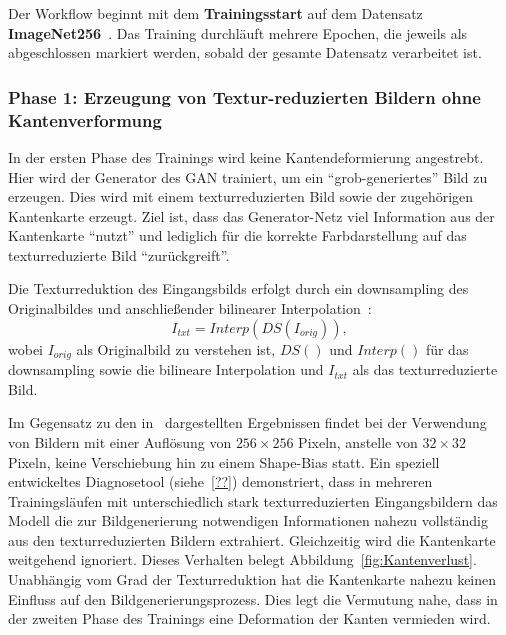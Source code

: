 Der Workflow beginnt mit dem \textbf{Trainingsstart} auf dem Datensatz \textbf{ImageNet256}~\cite{Uriot2023imageNet}. Das Training durchläuft mehrere Epochen, die jeweils als abgeschlossen markiert werden, sobald der gesamte Datensatz verarbeitet ist.

\newpage



\subsubsection{Phase 1: Erzeugung von Textur-reduzierten Bildern ohne Kantenverformung}
In der ersten Phase des Trainings wird keine Kantendeformierung angestrebt. Hier wird der Generator des \ac{GAN} trainiert, um ein \enquote{grob-generiertes} Bild zu erzeugen. Dies wird mit einem texturreduzierten Bild sowie der zugehörigen Kantenkarte erzeugt. Ziel ist, dass das Generator-Netz viel Information aus der Kantenkarte \enquote{nutzt} und lediglich für die korrekte Farbdarstellung auf das texturreduzierte Bild \enquote{zurückgreift}.

Die Texturreduktion des Eingangsbilds erfolgt durch ein downsampling des Originalbildes und anschließender bilinearer Interpolation~\cite{He_2023_ICCV}:
\begin{equation}
    I_{txt}=Interp(DS(I_{orig})), 
\end{equation}
wobei $I_{orig}$ als Originalbild zu verstehen ist, $DS()$ und $Interp()$ für das downsampling sowie die bilineare Interpolation und $I_{txt}$ als das texturreduzierte Bild.

Im Gegensatz zu den in~\cite{He_2023_ICCV} dargestellten Ergebnissen findet bei der Verwendung von Bildern mit einer Auflösung von $256 \times 256$ Pixeln, anstelle von $32 \times 32$ Pixeln, keine Verschiebung hin zu einem Shape-Bias statt. Ein speziell entwickeltes Diagnosetool  (siehe~\ref{??}) demonstriert, dass in mehreren Trainingsläufen mit unterschiedlich stark texturreduzierten Eingangsbildern das Modell die zur Bildgenerierung notwendigen Informationen nahezu vollständig aus den texturreduzierten Bildern extrahiert. Gleichzeitig wird die Kantenkarte weitgehend ignoriert. Dieses Verhalten belegt Abbildung~\ref{fig:Kantenverlust}. Unabhängig vom Grad der Texturreduktion hat die Kantenkarte nahezu keinen Einfluss auf den Bildgenerierungsprozess. Dies legt die Vermutung nahe, dass in der zweiten Phase des Trainings eine Deformation der Kanten vermieden wird.

